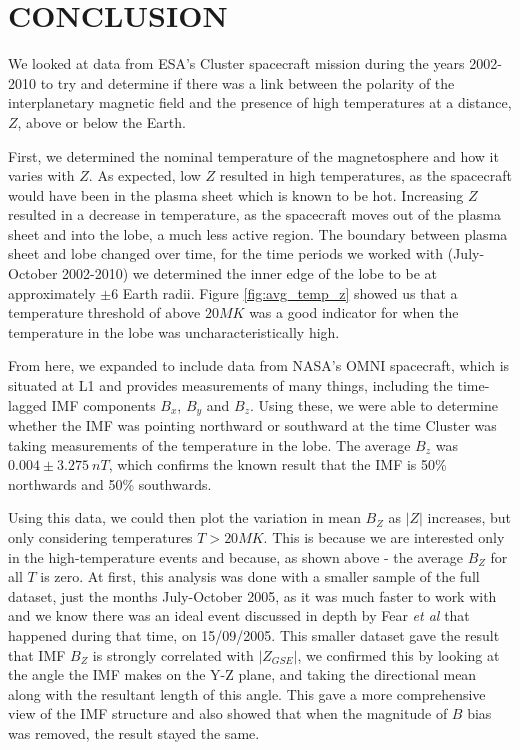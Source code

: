 \documentclass[12pt]{article}
\begin{document}
\section{CONCLUSION}
We looked at data from ESA's Cluster spacecraft mission during the years 2002-2010 to try and determine if there was a link between the polarity of the interplanetary magnetic field and the presence of high temperatures at a distance, $Z$, above or below the Earth.

First, we determined the nominal temperature of the magnetosphere and how it varies with $Z$. As expected, low $Z$ resulted in high temperatures, as the spacecraft would have been in the plasma sheet which is known to be hot. Increasing $Z$ resulted in a decrease in temperature, as the spacecraft moves out of the plasma sheet and into the lobe, a much less active region. The boundary between plasma sheet and lobe changed over time, for the time periods we worked with (July-October 2002-2010) we determined the inner edge of the lobe to be at approximately $\pm6$ Earth radii. Figure \ref{fig:avg_temp_z} showed us that a temperature threshold of above $20MK$ was a good indicator for when the temperature in the lobe was uncharacteristically high.

From here, we expanded to include data from NASA's OMNI spacecraft, which is situated at L1 and provides measurements of many things, including the time-lagged IMF components $B_x$, $B_y$ and $B_z$. Using these, we were able to determine whether the IMF was pointing northward or southward at the time Cluster was taking measurements of the temperature in the lobe. The average $B_z$ was $0.004\pm3.275\ nT$, which confirms the known result that the IMF is 50\% northwards and 50\% southwards.

Using this data, we could then plot the variation in mean $B_Z$ as $|Z|$ increases, but only considering temperatures $T>20MK$. This is because we are interested only in the high-temperature events and because, as shown above - the average $B_Z$ for all $T$ is zero. At first, this analysis was done with a smaller sample of the full dataset, just the months July-October 2005, as it was much faster to work with and we know there was an ideal event discussed in depth by Fear \textit{et al} \cite{Fear1506} that happened during that time, on 15/09/2005. This smaller dataset gave the result that IMF $B_Z$ is strongly correlated with $|Z_{GSE}|$, we confirmed this by looking at the angle the IMF makes on the Y-Z plane, and taking the directional mean along with the resultant length of this angle. This gave a more comprehensive view of the IMF structure and also showed that when the magnitude of $B$ bias was removed, the result stayed the same.
\end{document}
